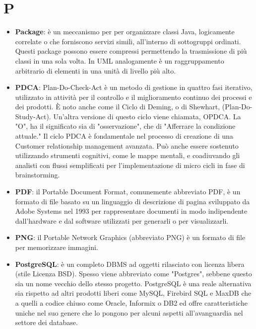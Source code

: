 \section{P}
\begin{itemize} 
	\item
	\textbf{Package}: è un meccanismo per per organizzare classi Java, logicamente correlate o che forniscono servizi simili, all’interno di sottogruppi ordinati. Questi package possono essere compressi permettendo la trasmissione di più classi in una sola volta.
	In UML analogamente è un raggruppamento arbitrario di elementi in una unità di livello più alto.
	\item
	\textbf{PDCA}: Plan-Do-Check-Act è un metodo di gestione in quattro fasi iterativo, utilizzato in attività per il controllo e il miglioramento continuo dei processi e dei prodotti. È noto anche come il Ciclo di Deming, o di Shewhart, (Plan-Do-Study-Act). Un'altra versione di questo ciclo viene chiamata, OPDCA. La "O", ha il significato sia di "osservazione", che di "Afferrare la condizione attuale." Il ciclo PDCA è fondamentale nel processo di creazione di una Customer relationship management avanzata. Può anche essere sostenuto utilizzando strumenti cognitivi, come le mappe mentali, e coadiuvando gli analisti con flussi semplificati per l'implementazione di micro cicli in fase di brainstorming.
	\item
	\textbf{PDF}: il Portable Document Format, comunemente abbreviato PDF, è un formato di file basato su un linguaggio di descrizione di pagina sviluppato da Adobe Systems nel 1993 per rappresentare documenti in modo indipendente dall’hardware e dal software utilizzati per generarli o per visualizzarli.
	\item
	\textbf{PNG}: il Portable Network Graphics (abbreviato PNG) è un formato di file per memorizzare immagini.
	\item
	\textbf{PostgreSQL}: è un completo DBMS ad oggetti rilasciato con licenza libera (stile Licenza BSD). Spesso viene abbreviato come "Postgres", sebbene questo sia un nome vecchio dello stesso progetto.
	PostgreSQL è una reale alternativa sia rispetto ad altri prodotti liberi come MySQL, Firebird SQL e MaxDB che a quelli a codice chiuso come Oracle, Informix o DB2 ed offre caratteristiche uniche nel suo genere che lo pongono per alcuni aspetti all'avanguardia nel settore dei database.
\end{itemize}

